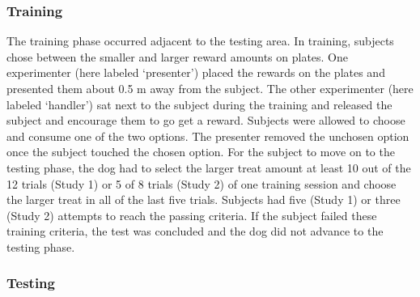\documentclass[
  pub,floatsintext]{apa6}
\begin{document}
\hypertarget{training}{%
\subsubsection{Training}\label{training}}

The training phase occurred adjacent to the testing area. In training, subjects chose between the smaller and larger reward amounts on plates. One experimenter (here labeled `presenter') placed the rewards on the plates and presented them about 0.5 m away from the subject. The other experimenter (here labeled `handler') sat next to the subject during the training and released the subject and encourage them to go get a reward. Subjects were allowed to choose and consume one of the two options. The presenter removed the unchosen option once the subject touched the chosen option. For the subject to move on to the testing phase, the dog had to select the larger treat amount at least 10 out of the 12 trials (Study 1) or 5 of 8 trials (Study 2) of one training session and choose the larger treat in all of the last five trials. Subjects had five (Study 1) or three (Study 2) attempts to reach the passing criteria. If the subject failed these training criteria, the test was concluded and the dog did not advance to the testing phase.

\hypertarget{testing}{%
\subsubsection{Testing}\label{testing}}
\end{document}
